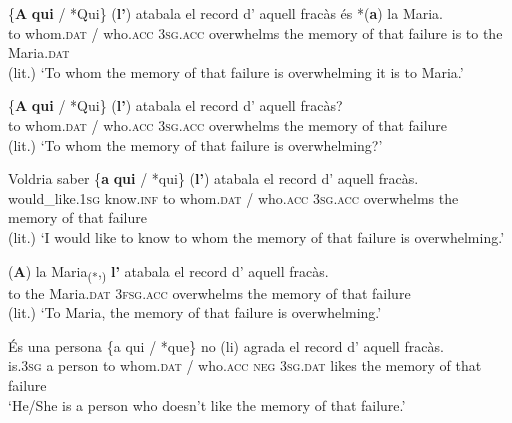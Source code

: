 \documentclass[output=paper,colorlinks,citecolor=brown,modfonts,nonflat]{langsci/langscibook}
\begin{document}
 \ex \label{ex:royo:14b}
 \gll \{\textbf{A} \textbf{qui} / *Qui\} (\textbf{l’}) atabala el record d’ aquell fracàs és *(\textbf{a}) la Maria.\\
 to whom.\textsc{dat} / who.\textsc{acc} \textsc{3sg.acc} overwhelms the memory of that failure is to the Maria.\textsc{dat}\\
\glt (lit.) ‘To whom the memory of that failure is overwhelming it is to Maria.’

 \ex \label{ex:royo:14c}
 \gll \{\textbf{A} \textbf{qui} / *Qui\} (\textbf{l’}) atabala el record d' aquell fracàs?\\
 to whom.\textsc{dat} / who.\textsc{acc} \textsc{3sg.acc} overwhelms the memory of that failure\\
\glt (lit.) ‘To whom the memory of that failure is overwhelming?’

 \ex \label{ex:royo:14d}
 \gll Voldria saber \{\textbf{a} \textbf{qui} / *qui\} (\textbf{l’}) atabala el record d’ aquell fracàs.\\
 would\_like.\textsc{1sg} know.\textsc{inf}  to whom.\textsc{dat} / who.\textsc{acc} \textsc{3sg.acc} overwhelms the memory of that failure\\
\glt (lit.) ‘I would like to know to whom the memory of that failure is overwhelming.’

 \ex \label{ex:royo:14e}
 \gll *(\textbf{A}) la Maria\textsubscript{(*},\textsubscript{)} \textbf{l’} atabala el record d’ aquell fracàs.\footnotemark{}\\
 to the Maria.\textsc{dat} \textsc{3fsg.acc} overwhelms the memory of that failure\\
\glt (lit.) ‘To Maria, the memory of that failure is overwhelming.’
 \z
 \z




\ea%
 \label{ex:royo:15}

 \ea\label{ex:royo:15a}
 \gll És una persona \{a qui / *que\} no (li) agrada el record d’ aquell fracàs.\\
 is.\textsc{3sg}  a person to whom.\textsc{dat} / who.\textsc{acc} \textsc{neg} \textsc{3sg.dat} likes the memory of that failure\\
\glt ‘He/She is a person who doesn’t like the memory of that failure.’
\end{document}
